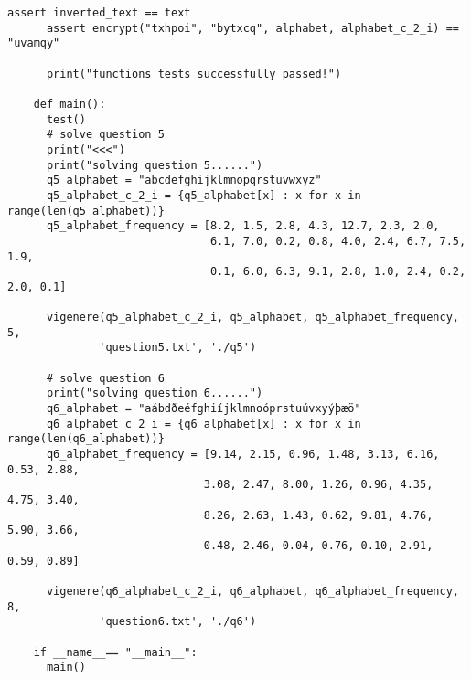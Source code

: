 \documentclass[12pt,letterpaper]{article}
\begin{document}
\begin{lstlisting}[style = Python]
      assert inverted_text == text
      assert encrypt("txhpoi", "bytxcq", alphabet, alphabet_c_2_i) == "uvamqy"
    
      print("functions tests successfully passed!")
    
    def main():
      test()
      # solve question 5 
      print("<<<")
      print("solving question 5......")
      q5_alphabet = "abcdefghijklmnopqrstuvwxyz"
      q5_alphabet_c_2_i = {q5_alphabet[x] : x for x in range(len(q5_alphabet))}
      q5_alphabet_frequency = [8.2, 1.5, 2.8, 4.3, 12.7, 2.3, 2.0, 
                               6.1, 7.0, 0.2, 0.8, 4.0, 2.4, 6.7, 7.5, 1.9, 
                               0.1, 6.0, 6.3, 9.1, 2.8, 1.0, 2.4, 0.2, 2.0, 0.1]
    
      vigenere(q5_alphabet_c_2_i, q5_alphabet, q5_alphabet_frequency, 5, 
              'question5.txt', './q5')
    
      # solve question 6
      print("solving question 6......")
      q6_alphabet = "aábdðeéfghiíjklmnoóprstuúvxyýþæö"
      q6_alphabet_c_2_i = {q6_alphabet[x] : x for x in range(len(q6_alphabet))}
      q6_alphabet_frequency = [9.14, 2.15, 0.96, 1.48, 3.13, 6.16, 0.53, 2.88, 
                              3.08, 2.47, 8.00, 1.26, 0.96, 4.35, 4.75, 3.40, 
                              8.26, 2.63, 1.43, 0.62, 9.81, 4.76, 5.90, 3.66, 
                              0.48, 2.46, 0.04, 0.76, 0.10, 2.91, 0.59, 0.89]

      vigenere(q6_alphabet_c_2_i, q6_alphabet, q6_alphabet_frequency, 8, 
              'question6.txt', './q6')

    if __name__== "__main__":
      main()
  \end{lstlisting}
\end{document}
